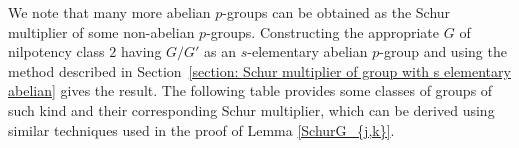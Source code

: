\documentclass[preprint,sort&compress,12pt]{elsarticle}
\newtheorem{theorem}{Theorem}[section]
\newtheorem{corollary}[theorem]{Corollary}
\numberwithin{equation}{section}
\theoremstyle{definition}
\newcommand{\Z}{\mathbb{Z}}
\begin{document}

    






We note that many more abelian $p$-groups can be obtained as the Schur multiplier of some non-abelian $p$-groups. Constructing the appropriate $G$ of nilpotency class $2$ having $G/G'$ as an $s$-elementary abelian $p$-group and using the  method described in Section~\ref{section: Schur multiplier of group with s elementary abelian} gives the result. The following table provides some classes of groups of such kind and their corresponding Schur multiplier, which can be derived using similar techniques used in the proof of Lemma \ref{SchurG_{j,k}}.  
\end{document}
